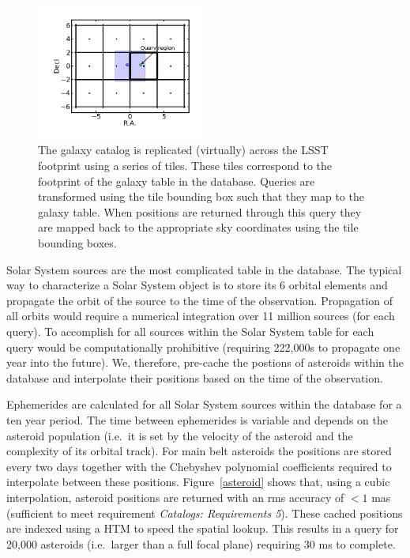 \documentclass[11pt]{article}
\begin{document}
\begin{figure}[t]
\centering
\includegraphics[width=0.5\textwidth]{validation_figures/basicDemo.png}
\caption{The galaxy catalog is replicated (virtually) across the LSST
  footprint using a series of tiles. These tiles correspond to the
  footprint of the galaxy table in the database. Queries are
  transformed using the tile bounding box such that they map to the
  galaxy table. When positions are returned through this query they
  are mapped back to the appropriate sky coordinates using the tile
  bounding boxes.}
\label{fig:galcoverage}
\end{figure}

Solar System sources are the most complicated table in the
database. The typical way to characterize a Solar System object is to
store its 6 orbital elements and propagate the orbit of the source to
the time of the observation. Propagation of all orbits would require a
numerical integration over 11 million sources (for each query). To
accomplish for all sources within the Solar System table for each
query would be computationally prohibitive (requiring 222,000s to
propagate one year into the future). We, therefore, pre-cache the
postions of asteroids within the database and interpolate their
positions based on the time of the observation.

Ephemerides are calculated for all Solar System sources within the
database for a ten year period. The time between ephemerides is
variable and depends on the asteroid population (i.e.\ it is set by
the velocity of the asteroid and the complexity of its orbital
track). For main belt asteroids the positions are stored every two
days together with the Chebyshev polynomial coefficients required to
interpolate between these positions. Figure~\ref{asteroid} shows that,
using a cubic interpolation, asteroid positions are returned with an
rms accuracy of $<1$ mas (sufficient to meet requirement {\it
  Catalogs: Requirements 5}). These cached positions are indexed using
a HTM to speed the spatial lookup. This results in a query for 20,000
asteroids (i.e.\ larger than a full focal plane) requiring 30 ms to
complete.
\end{document}
